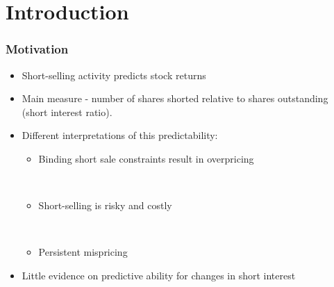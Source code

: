 \documentclass{beamer}
\begin{document}
\section{Introduction}
\begin{frame}
	\frametitle{Motivation}
	
	\begin{itemize}
		\item Short-selling activity predicts stock returns\\ 
		\begin{scriptsize}
		\citep[e.g.,][]{desai_investigation_2002,boehmer_which_2008,diether_short-sale_2009,akbas_short_2013,rapach_short_2016}	
		\end{scriptsize}
		
		\item Main measure - number of shares shorted relative to shares outstanding (short interest ratio).
		
		\item Different interpretations of this predictability:
		\begin{itemize}
			\item Binding short sale constraints result in overpricing 					\begin{scriptsize}\\
				\citep[e.g.,][]{miller_risk_1977, asquith_short_2005} 
			\end{scriptsize}	
			\vspace*{0.1cm}
			\item Short-selling is risky and costly 
			\begin{scriptsize}\\
				\citep[e.g.,][]{drechsler_shorting_2016,hong_days_2016, engelberg_short_2016} 
			\end{scriptsize}
			\item Persistent mispricing  \\
			{\scriptsize \citep[e.g.,][]{boehmer_good_2010}}
		\end{itemize}
		
		\item Little evidence on predictive ability for changes in short interest \\
		 {\scriptsize \citep{boehmer_good_2010}}
		 	
	\end{itemize}
\end{frame}
\end{document}
